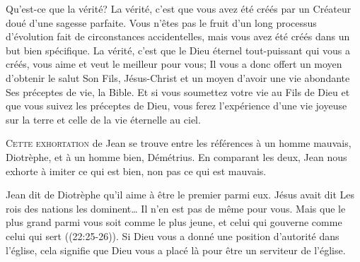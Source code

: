 Qu'est-ce que la vérité? La vérité, c'est que vous avez été créés
 par un Créateur doué d'une sagesse parfaite.
 Vous n'êtes pas le fruit d'un long processus d'évolution
 fait de circonstances accidentelles, mais vous avez été créés
 dans un but bien spécifique. La vérité, c'est que le Dieu éternel
 tout-puissant qui vous a créés, vous aime et veut le meilleur pour vous;
 Il vous a donc offert un moyen d'obtenir le salut
 \ocadr Son Fils, Jésus-Christ \fcadr{} et un moyen d'avoir une vie abondante
 \ocadr Ses préceptes de vie, la Bible.
 Et si vous soumettez votre vie au Fils de Dieu et que vous suivez
 les préceptes de Dieu, vous ferez l'expérience d'une vie joyeuse
 sur la terre et celle de la vie éternelle au ciel. 

\dvrule







\lettrine{C}{ette exhortation} de Jean se trouve entre les références
 à un homme mauvais, Diotrèphe, et à un homme bien, 
 Démétrius.
 En comparant les deux, Jean nous exhorte à imiter ce qui est bien, 
 non pas ce qui est mauvais. 

Jean dit de Diotrèphe qu'il \Og aime à être le premier parmi eux. \Fg{}
 Jésus avait dit\frcolon{} 
 \Og Les rois des nations les dominent\dots{}
 Il n'en est pas de même pour vous. Mais que le plus grand parmi vous
 soit comme le plus jeune, et celui qui gouverne comme celui qui sert \Fg{}
 ((22:25-26)).
 Si Dieu vous a donné une position d'autorité dans l'église,
 cela signifie que Dieu vous a placé là pour être un serviteur de l'église.



